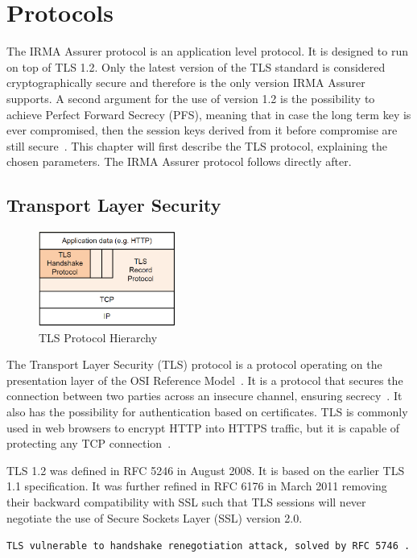 \section{Protocols}
The IRMA Assurer protocol is an application level protocol. It is designed to run on top of TLS 1.2. Only the latest version of the TLS standard is considered cryptographically secure and therefore is the only version IRMA Assurer supports. A second argument for the use of version 1.2 is the possibility to achieve Perfect Forward Secrecy (PFS), meaning that in case the long term key is ever compromised, then the session keys derived from it before compromise are still secure~\cite{PFS}. This chapter will first describe the TLS protocol, explaining the chosen parameters. The IRMA Assurer protocol follows directly after.

\subsection{Transport Layer Security}
\begin{figure}
  \centering
	\includegraphics[width=0.4\textwidth]{images/tlsstack.png}
	\caption{TLS Protocol Hierarchy}
	\label{fig:tlsstack}
\end{figure}

The Transport Layer Security (TLS) protocol is a protocol operating on the presentation layer of the OSI Reference Model~\cite{osi}. It is a protocol that secures the connection between two parties across an insecure channel, ensuring secrecy~\cite{tls1.2}. It also has the possibility for authentication based on certificates. TLS is commonly used in web browsers to encrypt HTTP into HTTPS traffic, but it is capable of protecting any TCP connection~\cite{lecture}.

TLS 1.2 was defined in RFC 5246 in August 2008. It is based on the earlier TLS 1.1 specification. It was further refined in RFC 6176 in March 2011 removing their backward compatibility with SSL such that TLS sessions will never negotiate the use of Secure Sockets Layer (SSL) version 2.0.

\texttt{TLS vulnerable to handshake renegotiation attack, solved by RFC 5746~\cite{lecture}.}

